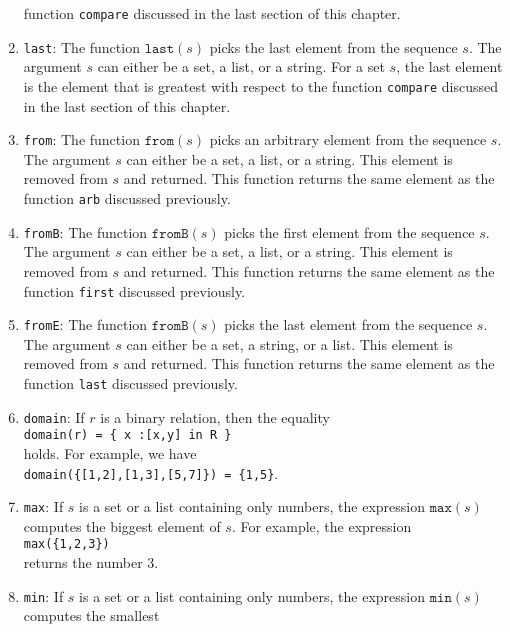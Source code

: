 \begin{enumerate}
      function \texttt{compare} discussed in the last section of this chapter.
\item \texttt{last}: The function $\texttt{last}(s)$ picks the last element from the
      sequence $s$.  The argument $s$ can either be a set, a list, or a string.
      For a set $s$, the last element is the element that is greatest with respect to the
      function \texttt{compare} discussed in the last section of this chapter.
\item \texttt{from}: The function $\texttt{from}(s)$ picks an arbitrary element from the
      sequence $s$.  The argument $s$ can either be a set, a list, or a string.  This
      element is removed from $s$ and returned.  This function returns the same element as
      the function \texttt{arb} discussed previously.
\item \texttt{fromB}: The function $\texttt{fromB}(s)$ picks the first element from the
      sequence $s$.  The argument $s$ can either be a set, a list, or a string.  This
      element is 
      removed from $s$ and returned.  This function returns the same element as the
      function \texttt{first} discussed previously.
\item \texttt{fromE}: The function $\texttt{fromB}(s)$ picks the last element from the
      sequence $s$.  The argument $s$ can either be a set, a string, or a list.  This element is
      removed from $s$ and returned.  This function returns the same element as the
      function \texttt{last} discussed previously.
\item \texttt{domain}: If $r$ is a binary relation, then the equality
      \\[0.2cm]
      \hspace*{1.3cm}
      \texttt{domain(r) = \{ x :[x,y] in R \}}
      \\[0.2cm]
      holds.  For example, we have
      \\[0.2cm]
      \hspace*{1.3cm}
      \texttt{domain(\{[1,2],[1,3],[5,7]\}) = \{1,5\}}.
\item \texttt{max}:  If $s$ is a set or a list containing only numbers, the expression $\mathtt{max}(s)$ computes the biggest
      element of $s$.  For example, the expression
      \\[0.2cm]
      \hspace*{1.3cm}
      \texttt{max(\{1,2,3\})}
      \\[0.2cm]
      returns the number $3$.  
\item \texttt{min}:  If $s$ is a set or a list containing only numbers, the expression $\mathtt{min}(s)$ computes the smallest

\end{enumerate}
